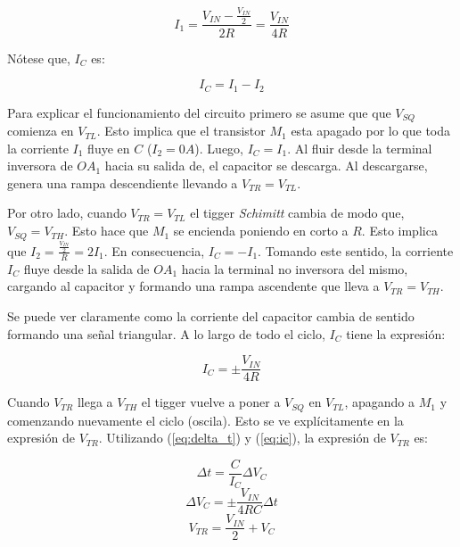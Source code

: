 \begin{displaymath}
    I_1 = \frac{V_{IN} - \frac{V_{IN}}{2}}{2R} = \frac{V_{IN}}{4R}
\end{displaymath}

Nótese que, $I_C$ es:

\begin{displaymath}
    I_C = I_1 - I_2
\end{displaymath}

Para explicar el funcionamiento del circuito primero se asume que que $V_{SQ}$ comienza en $V_{TL}$. Esto implica que el transistor $M_1$ esta apagado por lo que toda la corriente $I_1$ fluye en $C$ ($I_2 = 0A$). Luego, $I_C = I_1$. Al fluir desde la terminal inversora de $OA_1$ hacia su salida de, el capacitor se descarga. Al descargarse, genera una rampa descendiente llevando a $V_{TR} = V_{TL}$. 

Por otro lado, cuando $V_{TR} = V_{TL}$ el tigger \textit{Schimitt} cambia de modo que, $V_{SQ} = V_{TH}$. Esto hace que $M_1$ se encienda poniendo en corto a $R$. Esto implica que $I_2 = \frac{\frac{V_{IN}}{2}}{R} = 2 I_1$. En consecuencia, $I_C = -I_1$. Tomando este sentido, la corriente $I_C$ fluye desde la salida de $OA_1$ hacia la terminal no inversora del mismo, cargando al capacitor y formando una rampa ascendente que lleva a $V_{TR} = V_{TH}$.  

Se puede ver claramente como la corriente del capacitor cambia de sentido formando una señal triangular. A lo largo de todo el ciclo, $I_C$ tiene la expresión:

\begin{equation}
    I_C = \pm \frac{V_{IN}}{4R}
    \label{eq:ic}
\end{equation}



Cuando $V_{TR}$ llega a $V_{TH}$ el tigger vuelve a poner a $V_{SQ}$ en $V_{TL}$, apagando a $M_1$ y comenzando nuevamente el ciclo (oscila). Esto se ve explícitamente en la expresión de $V_{TR}$. Utilizando (\ref{eq:delta_t}) y (\ref{eq:ic}), la expresión de $V_{TR}$ es:


\begin{displaymath} \Delta t = \frac{C}{I_C} \Delta V_C  \end{displaymath}
\begin{displaymath} \Delta V_C = \pm \frac{V_{IN}}{4RC} \Delta t  \end{displaymath}
\begin{displaymath} V_{TR} = \frac{V_{IN}}{2} + V_C \end{displaymath}

